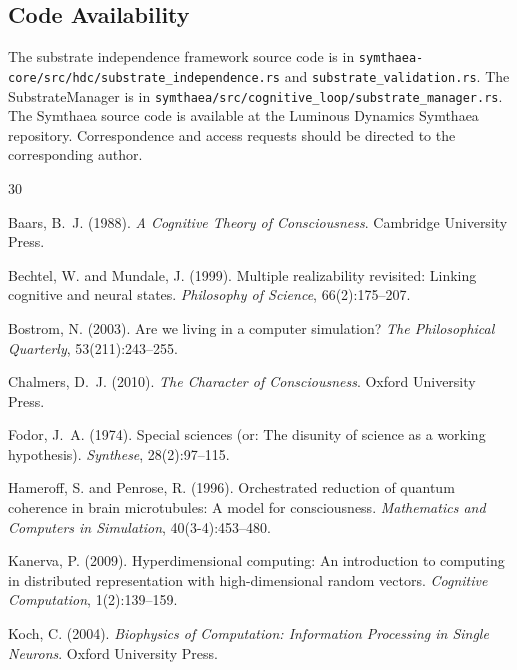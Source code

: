 \documentclass[12pt,a4paper]{article}
\begin{document}
\subsection*{Code Availability}

The substrate independence framework source code is in \texttt{symthaea-core/src/hdc/substrate\_independence.rs} and \texttt{substrate\_validation.rs}. The SubstrateManager is in \texttt{symthaea/src/cognitive\_loop/substrate\_manager.rs}. The Symthaea source code is available at the Luminous Dynamics Symthaea repository. Correspondence and access requests should be directed to the corresponding author.


\begin{thebibliography}{30}

Baars, B.~J. (1988).
\newblock \emph{A Cognitive Theory of Consciousness}.
\newblock Cambridge University Press.

Bechtel, W. and Mundale, J. (1999).
\newblock Multiple realizability revisited: Linking cognitive and neural states.
\newblock \emph{Philosophy of Science}, 66(2):175--207.

Bostrom, N. (2003).
\newblock Are we living in a computer simulation?
\newblock \emph{The Philosophical Quarterly}, 53(211):243--255.

Chalmers, D.~J. (2010).
\newblock \emph{The Character of Consciousness}.
\newblock Oxford University Press.

Fodor, J.~A. (1974).
\newblock Special sciences (or: The disunity of science as a working hypothesis).
\newblock \emph{Synthese}, 28(2):97--115.

Hameroff, S. and Penrose, R. (1996).
\newblock Orchestrated reduction of quantum coherence in brain microtubules: A model for consciousness.
\newblock \emph{Mathematics and Computers in Simulation}, 40(3-4):453--480.

Kanerva, P. (2009).
\newblock Hyperdimensional computing: An introduction to computing in distributed representation with high-dimensional random vectors.
\newblock \emph{Cognitive Computation}, 1(2):139--159.

Koch, C. (2004).
\newblock \emph{Biophysics of Computation: Information Processing in Single Neurons}.
\newblock Oxford University Press.


\end{thebibliography}
\end{document}
